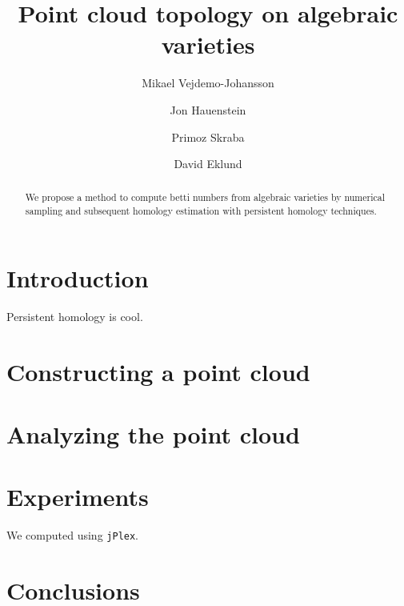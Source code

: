 \documentclass{amsart}
\begin{document}
\title{Point cloud topology on algebraic varieties}
\author{Mikael Vejdemo-Johansson \and %
  Jon Hauenstein \and %
  Primoz Skraba \and %
  David Eklund}

\maketitle

\begin{abstract}
  We propose a method to compute betti numbers from algebraic varieties by numerical sampling and subsequent homology estimation with persistent homology techniques.
\end{abstract}

\section{Introduction}
\label{sec:introduction}

Persistent homology is cool. \cite{elz2000,c09TandD}


\section{Constructing a point cloud}
\label{sec:constr-point-cloud}

\section{Analyzing the point cloud}
\label{sec:analyz-point-cloud}


\section{Experiments}
\label{sec:experiments}

We computed using \texttt{jPlex}. \cite{jplex08}

\section{Conclusions}
\label{sec:conclusions}





\end{document}
